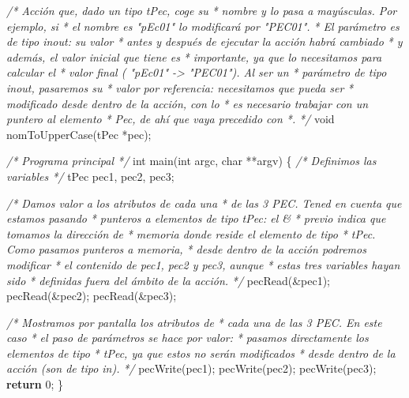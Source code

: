 \documentclass[
]{book}
\newenvironment{Shaded}{\begin{snugshade}}{\end{snugshade}}
\newcommand{\CommentTok}[1]{\textcolor[rgb]{0.56,0.35,0.01}{\textit{#1}}}
\newcommand{\ControlFlowTok}[1]{\textcolor[rgb]{0.13,0.29,0.53}{\textbf{#1}}}
\newcommand{\DataTypeTok}[1]{\textcolor[rgb]{0.13,0.29,0.53}{#1}}
\newcommand{\DecValTok}[1]{\textcolor[rgb]{0.00,0.00,0.81}{#1}}
\newcommand{\NormalTok}[1]{#1}
\begin{document}
\begin{Shaded}
\begin{Highlighting}[]
\CommentTok{/* Acción que, dado un tipo tPec, coge su}
\CommentTok{ * nombre y lo pasa a mayúsculas. Por ejemplo, si}
\CommentTok{ * el nombre es "pEc01" lo modificará por "PEC01".}
\CommentTok{ * El parámetro es de tipo \textquotesingle{}inout\textquotesingle{}: su valor}
\CommentTok{ * antes y después de ejecutar la acción habrá cambiado}
\CommentTok{ * y además, el valor inicial que tiene es}
\CommentTok{ * importante, ya que lo necesitamos para calcular el}
\CommentTok{ * valor final ( "pEc01" {-}\textgreater{} "PEC01"). Al ser un}
\CommentTok{ * parámetro de tipo \textquotesingle{}inout\textquotesingle{}, pasaremos su}
\CommentTok{ * valor por referencia: necesitamos que pueda ser}
\CommentTok{ * modificado desde dentro de la acción, con lo}
\CommentTok{ * es necesario trabajar con un puntero al elemento}
\CommentTok{ * Pec, de ahí que vaya precedido con *.}
\CommentTok{ */}
\DataTypeTok{void}\NormalTok{ nomToUpperCase(tPec *pec);}

\CommentTok{/* Programa principal */}
\DataTypeTok{int}\NormalTok{ main(}\DataTypeTok{int}\NormalTok{ argc, }\DataTypeTok{char}\NormalTok{ **argv) \{}
    \CommentTok{/* Definimos las variables */}
\NormalTok{    tPec pec1, pec2, pec3;}

    \CommentTok{/* Damos valor a los atributos de cada una}
\CommentTok{     * de las 3 PEC. Tened en cuenta que estamos pasando}
\CommentTok{     * punteros a elementos de tipo tPec: el \&}
\CommentTok{     * previo indica que tomamos la dirección de}
\CommentTok{     * memoria donde reside el elemento de tipo}
\CommentTok{     * tPec. Como pasamos punteros a memoria,}
\CommentTok{     * desde dentro de la acción podremos modificar}
\CommentTok{     * el contenido de pec1, pec2 y pec3, aunque}
\CommentTok{     * estas tres variables hayan sido}
\CommentTok{     * definidas fuera del ámbito de la acción.}
\CommentTok{     */}
\NormalTok{    pecRead(\&pec1);}
\NormalTok{    pecRead(\&pec2);}
\NormalTok{    pecRead(\&pec3);}
    
    \CommentTok{/* Mostramos por pantalla los atributos de}
\CommentTok{     * cada una de las 3 PEC. En este caso}
\CommentTok{     * el paso de parámetros se hace por valor:}
\CommentTok{     * pasamos directamente los elementos de tipo}
\CommentTok{     * tPec, ya que estos no serán modificados}
\CommentTok{     * desde dentro de la acción (son de tipo \textquotesingle{}in\textquotesingle{}).}
\CommentTok{     */}
\NormalTok{    pecWrite(pec1);}
\NormalTok{    pecWrite(pec2);}
\NormalTok{    pecWrite(pec3);}
    \ControlFlowTok{return} \DecValTok{0}\NormalTok{;}
\NormalTok{\}}


\end{Highlighting}
\end{Shaded}
\end{document}
